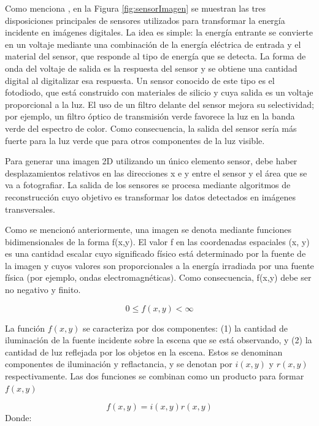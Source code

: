 	Como menciona \parencite{gonzalez2008digital}, en la Figura \ref{fig:sensorImagen} se muestran las tres disposiciones principales de sensores utilizados para transformar la energía incidente en imágenes digitales. La idea es simple: la energía entrante se convierte en un voltaje mediante una combinación de la energía eléctrica de entrada y el material del sensor, que responde al tipo de energía que se detecta. La forma de onda del voltaje de salida es la respuesta del sensor y se obtiene una cantidad digital al digitalizar esa respuesta. Un sensor conocido de este tipo es el fotodiodo, que está construido con materiales de silicio y cuya salida es un voltaje proporcional a la luz. El uso de un filtro delante del sensor mejora su selectividad; por ejemplo, un filtro óptico de transmisión verde favorece la luz en la banda verde del espectro de color. Como consecuencia, la salida del sensor sería más fuerte para la luz verde que para otros componentes de la luz visible.
	
	Para generar una imagen 2D utilizando un único elemento sensor, debe haber desplazamientos relativos en las direcciones x e y entre el sensor y el área que se va a fotografiar. La salida de los sensores se procesa mediante algoritmos de reconstrucción cuyo objetivo es transformar los datos detectados en imágenes transversales.
	
	Como se mencionó anteriormente, una imagen se denota mediante funciones bidimensionales de la forma f(x,y). El valor f en las coordenadas espaciales (x, y) es una cantidad escalar cuyo significado físico está determinado por la fuente de la imagen y cuyos valores son proporcionales a la energía irradiada por una fuente física (por ejemplo, ondas electromagnéticas). Como consecuencia, f(x,y) debe ser no negativo y finito.
	
	\begin{equation}
		\label{eq:img1}
		0 \leq f(x,y) < \infty
	\end{equation}
	
	La función $f(x,y)$ se caracteriza por dos componentes: (1) la cantidad de iluminación de la fuente incidente sobre la escena que se está observando, y (2) la cantidad de luz reflejada por los objetos en la escena. Estos se denominan componentes de iluminación y reflactancia, y se denotan por $i(x,y)$ y $r(x,y)$ respectivamente. Las dos funciones se combinan como un producto para formar $f(x,y)$
	
	\begin{equation}
		\label{eq:img2}
		f(x,y) = i(x,y)r(x,y)
	\end{equation}
	Donde:
	
